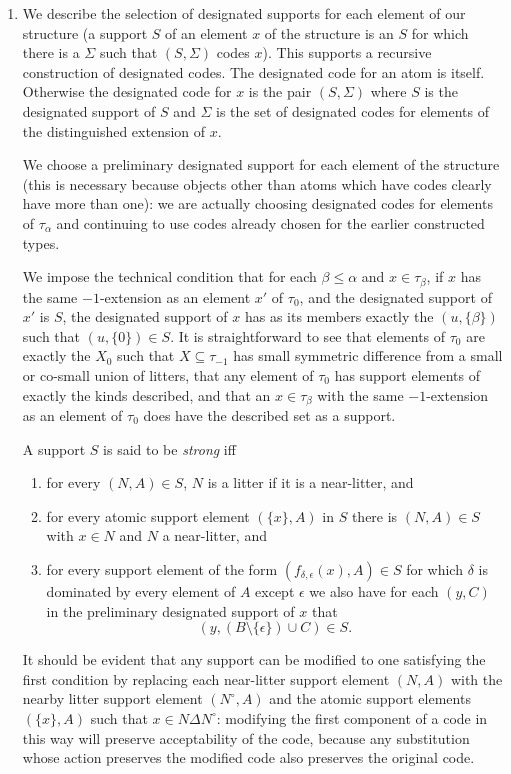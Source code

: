 \documentclass[12pt]{article}
\begin{document}
\begin{enumerate}
\item We describe the selection of designated supports for each element of our structure (a support $S$ of an element $x$ of the structure is an $S$ for which there is a $\Sigma$ such that $(S,\Sigma)$ codes $x$).  This supports a recursive construction of designated codes.
The designated code for an atom is itself.  Otherwise the designated code for $x$ is the pair $(S,\Sigma)$ where $S$ is the designated support of $S$ and $\Sigma$ is the set of designated codes for elements of the distinguished extension of $x$.

We choose a preliminary designated support for each element of the structure (this is necessary because objects other than atoms which have codes clearly have more than one):  we are actually
choosing designated codes for elements of $\tau_\alpha$ and continuing to use codes already chosen for the earlier constructed types.

We impose the technical condition that for each $\beta \leq \alpha$ and $x \in \tau_\beta$, if $x$ has the same $-1$-extension as an element $x'$  of $\tau_0$, and the designated support of $x'$ is $S$, the designated support of $x$ has as its members exactly the $(u,\{\beta\})$ such that $(u,\{0\}) \in S$.  It is straightforward to see that elements of $\tau_0$ are exactly the $X_0$ such that $X \subseteq \tau_{-1}$ has small symmetric difference from a small or co-small union of litters, that any element of $\tau_0$ has support elements of exactly the kinds described, and that an $x \in \tau_\beta$ with the same $-1$-extension as
an element of $\tau_0$ does have the described set as a support.

A support $S$ is said to be {\em strong\/} iff

\begin{enumerate}

\item for every $(N,A) \in S$, $N$ is a litter if it is a near-litter, and
\item  for every atomic support element $(\{x\},A)$ in $S$ there is $(N,A) \in S$ with $x \in N$ and $N$ a near-litter, and 

\item for every support element of the form $(f_{\delta,\epsilon}(x),A) \in S$ for which $\delta$ is dominated by every element of $A$ except $\epsilon$ we also have for each $(y,C)$ in the preliminary designated support
of $x$ that $$(y,(B \setminus \{\epsilon\})\cup C)\in S.$$

\end{enumerate}  It should be evident that any support can be modified to one satisfying the first condition by replacing each near-litter support element
$(N,A)$ with the nearby litter support element $(N^\circ,A)$ and the atomic support elements  $(\{x\},A)$ such that $x \in N \Delta N^\circ$:  modifying the first component of a code
in this way will preserve acceptability of the code, because any substitution whose action preserves the modified code also preserves the original code.


\end{enumerate}
\end{document}
